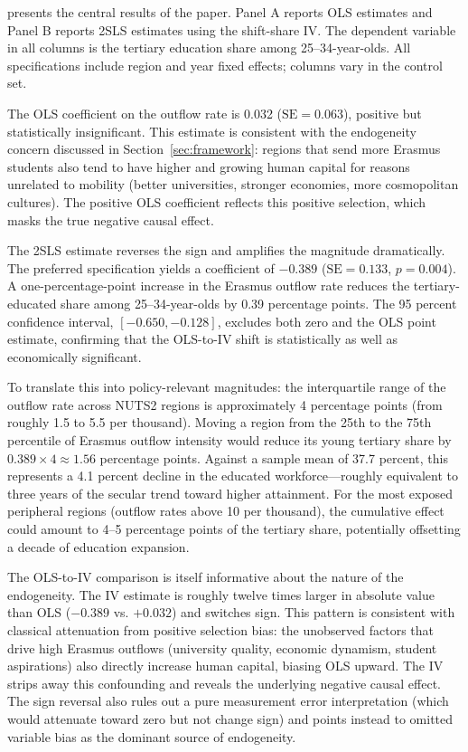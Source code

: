\documentclass[12pt]{article}
\begin{document}
 presents the central results of the paper. Panel A reports OLS estimates and Panel B reports 2SLS estimates using the shift-share IV. The dependent variable in all columns is the tertiary education share among 25--34-year-olds. All specifications include region and year fixed effects; columns vary in the control set.

The OLS coefficient on the outflow rate is 0.032 ($\text{SE} = 0.063$), positive but statistically insignificant. This estimate is consistent with the endogeneity concern discussed in Section~\ref{sec:framework}: regions that send more Erasmus students also tend to have higher and growing human capital for reasons unrelated to mobility (better universities, stronger economies, more cosmopolitan cultures). The positive OLS coefficient reflects this positive selection, which masks the true negative causal effect.

The 2SLS estimate reverses the sign and amplifies the magnitude dramatically. The preferred specification yields a coefficient of $-0.389$ ($\text{SE} = 0.133$, $p = 0.004$). A one-percentage-point increase in the Erasmus outflow rate reduces the tertiary-educated share among 25--34-year-olds by 0.39 percentage points. The 95 percent confidence interval, $[-0.650, -0.128]$, excludes both zero and the OLS point estimate, confirming that the OLS-to-IV shift is statistically as well as economically significant.

To translate this into policy-relevant magnitudes: the interquartile range of the outflow rate across NUTS2 regions is approximately 4 percentage points (from roughly 1.5 to 5.5 per thousand). Moving a region from the 25th to the 75th percentile of Erasmus outflow intensity would reduce its young tertiary share by $0.389 \times 4 \approx 1.56$ percentage points. Against a sample mean of 37.7 percent, this represents a 4.1 percent decline in the educated workforce---roughly equivalent to three years of the secular trend toward higher attainment. For the most exposed peripheral regions (outflow rates above 10 per thousand), the cumulative effect could amount to 4--5 percentage points of the tertiary share, potentially offsetting a decade of education expansion.

The OLS-to-IV comparison is itself informative about the nature of the endogeneity. The IV estimate is roughly twelve times larger in absolute value than OLS ($-0.389$ vs. $+0.032$) and switches sign. This pattern is consistent with classical attenuation from positive selection bias: the unobserved factors that drive high Erasmus outflows (university quality, economic dynamism, student aspirations) also directly increase human capital, biasing OLS upward. The IV strips away this confounding and reveals the underlying negative causal effect. The sign reversal also rules out a pure measurement error interpretation (which would attenuate toward zero but not change sign) and points instead to omitted variable bias as the dominant source of endogeneity.
\end{document}

